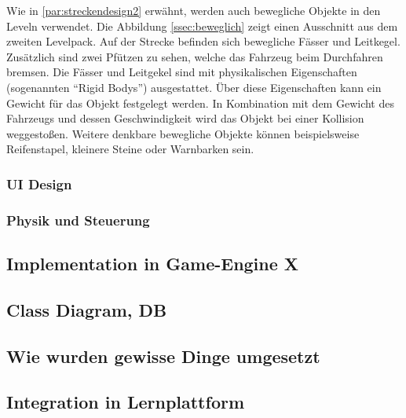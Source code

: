 		Wie in \ref{par:streckendesign2} erwähnt, werden auch bewegliche Objekte in den Leveln verwendet. Die Abbildung \ref{ssec:beweglich} zeigt einen Ausschnitt aus dem zweiten Levelpack. Auf der Strecke befinden sich bewegliche Fässer und Leitkegel. Zusätzlich sind zwei Pfützen zu sehen, welche das Fahrzeug beim Durchfahren bremsen. Die Fässer und Leitgekel sind mit physikalischen Eigenschaften (sogenannten \enquote{Rigid Bodys}) ausgestattet. Über diese Eigenschaften kann ein Gewicht für das Objekt festgelegt werden. In Kombination mit dem Gewicht des Fahrzeugs und dessen Geschwindigkeit wird das Objekt bei einer Kollision weggestoßen. Weitere denkbare bewegliche Objekte können beispielsweise Reifenstapel, kleinere Steine oder Warnbarken sein. 


	\subsubsection{UI Design}
	\subsubsection{Physik und Steuerung}
	\subsubsection{}
\subsection{Implementation in Game-Engine X}
\subsection{Class Diagram, DB}
\subsection{Wie wurden gewisse Dinge umgesetzt}
\subsection{Integration in Lernplattform}
